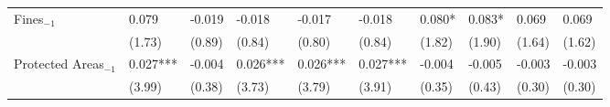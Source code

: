 \begin{landscape}
\begin{table}[htpb!]
\begin{tabularx}{0.82\linewidth}{l Z Z Z Z Z Z Z Z Z}
    Fines$_{-1}$ & 0.079	&	-0.019	&	-0.018	&	-0.017	&	-0.018	&	0.080*	&	0.083*	&	0.069	&	0.069	\\
                        & 	(1.73)	&	(0.89)	&	(0.84)	&	(0.80)	&	(0.84)	&	(1.82)	&	(1.90)	&	(1.64)	&	(1.62)	\\
    Protected Areas$_{-1}$ & 0.027***	&	-0.004	&	0.026***	&	0.026***	&	0.027***	&	-0.004	&	-0.005	&	-0.003	&	-0.003	\\
                        & 		(3.99)	&	(0.38)	&	(3.73)	&	(3.79)	&	(3.91)	&	(0.35)	&	(0.43)	&	(0.30)	&	(0.30)	\\

\end{tabularx}
\end{table}
\end{landscape}
